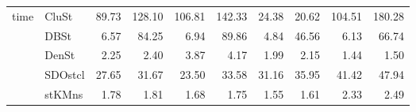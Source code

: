 \begin{table}
\begin{tabular}{llrrrrrrrr}
time & CluSt &      89.73 &      128.10 &       106.81 &        142.33 &         24.38 &          20.62 &           104.51 &            180.28 \\
     & DBSt &       6.57 &       84.25 &         6.94 &         89.86 &          4.84 &          46.56 &             6.13 &             66.74 \\
     & DenSt &       2.25 &        2.40 &         3.87 &          4.17 &          1.99 &           2.15 &             1.44 &              1.50 \\
     & SDOstcl &      27.65 &       31.67 &        23.50 &         33.58 &         31.16 &          35.95 &            41.42 &             47.94 \\
     & stKMns &       1.78 &        1.81 &         1.68 &          1.75 &          1.55 &           1.61 &             2.33 &              2.49 \\
\bottomrule
\end{tabular}
\end{table}
